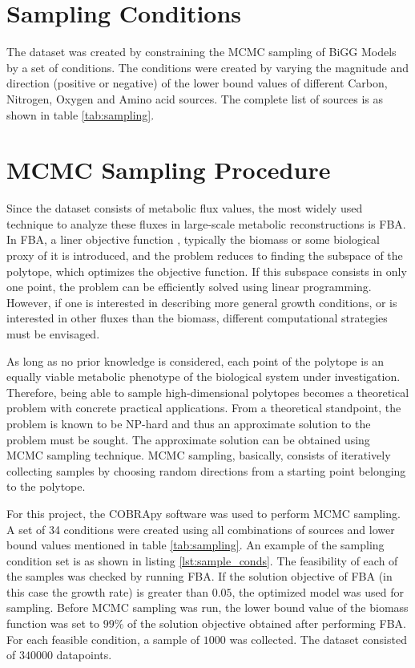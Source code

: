 \documentclass[12pt,chapterheads]{ucsd}
\begin{document}
\section{Sampling Conditions}
The dataset was created by constraining the MCMC sampling of BiGG Models by a set of conditions. The conditions were created by varying the magnitude and direction (positive or negative) of the lower bound values of different Carbon, Nitrogen, Oxygen and Amino acid sources.
The complete list of sources is as shown in table \ref{tab:sampling}.  

\section{MCMC Sampling Procedure}
Since the dataset consists of metabolic flux values, the most widely used technique to analyze these fluxes in large-scale metabolic reconstructions is FBA. In FBA, a liner objective function , typically the biomass or some biological proxy of it is introduced, and the problem reduces to finding the subspace of the polytope, which optimizes the objective function. If this subspace consists in only one point, the problem can be efficiently solved using linear programming. However, if one is interested in describing more general growth conditions, or is interested in other fluxes than the biomass, different computational strategies must be envisaged. 

As long as no prior knowledge is considered, each point of the polytope is an equally viable metabolic phenotype of the biological system under investigation. Therefore, being able to sample high-dimensional polytopes becomes a theoretical problem with concrete practical applications. From a theoretical standpoint, the problem is known to be NP-hard and thus an approximate solution to the problem must be sought. The approximate solution can be obtained using MCMC sampling technique. MCMC sampling, basically, consists of iteratively collecting samples by choosing random directions from a starting point belonging to the polytope.

For this project, the COBRApy software was used to perform MCMC sampling. A set of 34 conditions were created using all combinations of sources and lower bound values mentioned in table \ref{tab:sampling}. An example of the sampling condition set is as shown in listing \ref{lst:sample_conds}. The feasibility of each of the samples was checked by running FBA. If the solution objective of FBA (in this case the growth rate) is greater than $0.05$, the optimized model was used for sampling. Before MCMC sampling was run, the lower bound value of the biomass function was set to $99\%$ of the solution objective obtained after performing FBA. For each feasible condition, a sample of $1000$ was collected. The dataset consisted of $340000$ datapoints.
\end{document}
